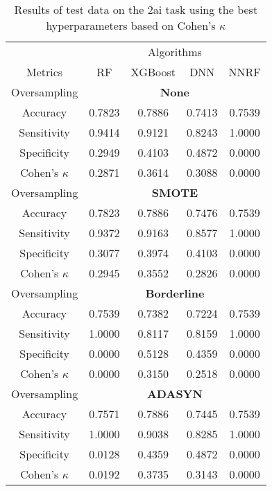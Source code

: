 \begin{table}[!htb]
\centering
\caption{Results of test data on the 2ai task using the best hyperparameters based on Cohen's $\kappa$}
\label{tab:kfold_results}
\begin{tabular}{c | c c c c}
\hline
 & \multicolumn{4}{c}{Algorithms}\\ 
Metrics &RF & XGBoost & DNN & NNRF\\ 
\hline
Oversampling &\multicolumn{4}{|c}{\textbf{None}}\\ 
\hline
Accuracy & 0.7823 & 0.7886 & 0.7413 & 0.7539\\ 
Sensitivity & 0.9414 & 0.9121 & 0.8243 & 1.0000\\ 
Specificity & 0.2949 & 0.4103 & 0.4872 & 0.0000\\ 
Cohen's $\kappa$ & 0.2871 & 0.3614 & 0.3088 & 0.0000\\ 
\hline
Oversampling &\multicolumn{4}{|c}{\textbf{SMOTE}}\\ 
\hline
Accuracy & 0.7823 & 0.7886 & 0.7476 & 0.7539\\ 
Sensitivity & 0.9372 & 0.9163 & 0.8577 & 1.0000\\ 
Specificity & 0.3077 & 0.3974 & 0.4103 & 0.0000\\ 
Cohen's $\kappa$ & 0.2945 & 0.3552 & 0.2826 & 0.0000\\ 
\hline
Oversampling &\multicolumn{4}{|c}{\textbf{Borderline}}\\ 
\hline
Accuracy & 0.7539 & 0.7382 & 0.7224 & 0.7539\\ 
Sensitivity & 1.0000 & 0.8117 & 0.8159 & 1.0000\\ 
Specificity & 0.0000 & 0.5128 & 0.4359 & 0.0000\\ 
Cohen's $\kappa$ & 0.0000 & 0.3150 & 0.2518 & 0.0000\\ 
\hline
Oversampling &\multicolumn{4}{|c}{\textbf{ADASYN}}\\ 
\hline
Accuracy & 0.7571 & 0.7886 & 0.7445 & 0.7539\\ 
Sensitivity & 1.0000 & 0.9038 & 0.8285 & 1.0000\\ 
Specificity & 0.0128 & 0.4359 & 0.4872 & 0.0000\\ 
Cohen's $\kappa$ & 0.0192 & 0.3735 & 0.3143 & 0.0000\\ 
\hline
\end{tabular}
\end{table}

